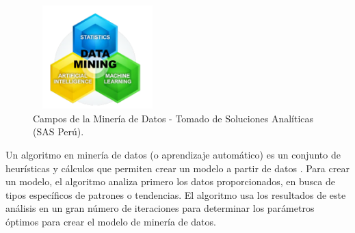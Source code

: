 \documentclass[10pt,journal]{IEEEtran}
\begin{document}
    \begin{figure}[H]
      \begin{center}
        \includegraphics[width=5cm, height=4cm]{figuras/miner45.PNG}
        \caption{Campos de la Minería de Datos - Tomado de Soluciones Analíticas (SAS Perú).}
        \label{miner45} 
        \end{center}
    \end{figure}  
    
    Un algoritmo en minería de datos (o aprendizaje automático) es un conjunto de heurísticas y cálculos que permiten crear un modelo a partir de datos \citep{mineria2}. Para crear un modelo, el algoritmo analiza primero los datos proporcionados, en busca de tipos específicos de patrones o tendencias. El algoritmo usa los resultados de este análisis en un gran número de iteraciones para determinar los parámetros óptimos para crear el modelo de minería de datos.
    
\end{document}

